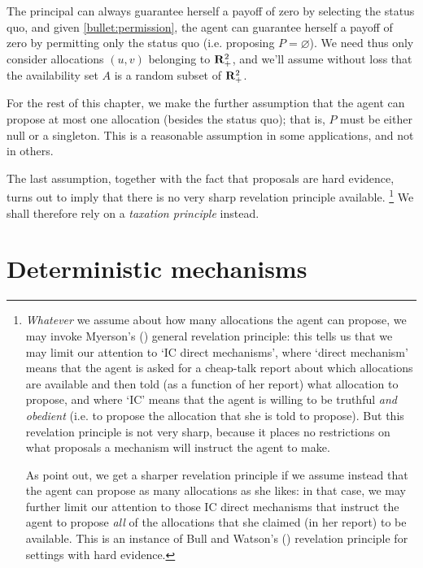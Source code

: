 The principal can always guarantee herself a payoff of zero by selecting the status quo,
and given \ref{bullet:permission}, the agent can guarantee herself a payoff of zero by permitting only the status quo (i.e. proposing $P = \varnothing$).
We need thus only consider allocations $(u,v)$ belonging to $\mathbf{R}_+^2$,
and we'll assume without loss that the availability set $A$ is a random subset of $\mathbf{R}_+^2$.

For the rest of this chapter, we make the further assumption that the agent can propose at most one allocation (besides the status quo); that is, $P$ must be either null or a singleton.
This is a reasonable assumption in some applications, and not in others.

The last assumption, together with the fact that proposals are hard evidence, turns out to imply that there is no very sharp revelation principle available.%
	\footnote{\emph{Whatever} we assume about how many allocations the agent can propose,
	we may invoke Myerson's (\citeyear{Myerson1982}) general revelation principle:
	this tells us that we may limit our attention to
	`IC direct mechanisms',
	where `direct mechanism' means that the agent is asked for a cheap-talk report about which allocations are available
	and then told (as a function of her report) what allocation to propose,
	and where `IC' means that the agent
	is willing to be truthful
	\emph{and obedient} (i.e. to propose the allocation that she is told to propose).
	But this revelation principle is not very sharp,
	because it places no restrictions on what proposals a mechanism will instruct the agent to make.

	As \textcite{GuoShmaya2021} point out,
	we get a sharper revelation principle if we assume instead that the agent can propose as many allocations as she likes:
	in that case, we may further limit our attention to those IC direct mechanisms that instruct the agent to propose \emph{all} of the allocations that she claimed (in her report) to be available.
	This is an instance of Bull and Watson's (\citeyear{BullWatson2007}) revelation principle for settings with hard evidence.}
We shall therefore rely on a \emph{taxation principle} instead.



\section{Deterministic mechanisms}
\label{sec:ch4:deterministic}



